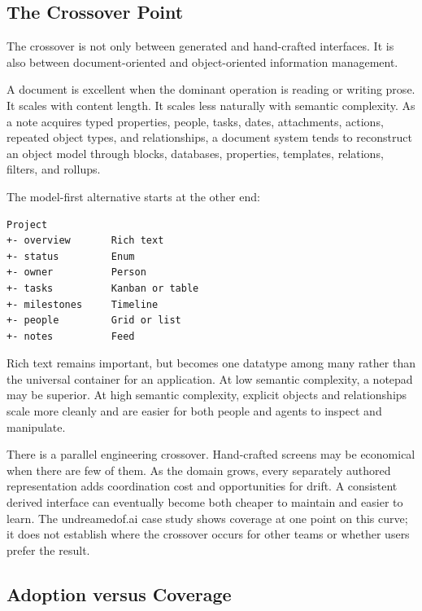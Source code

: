 \documentclass[sigplan,review,anonymous,10pt]{acmart}
\begin{document}
\subsection{The Crossover Point}

The crossover is not only between generated and hand-crafted interfaces. It is also between document-oriented and object-oriented information management.

A document is excellent when the dominant operation is reading or writing prose. It scales with content length. It scales less naturally with semantic complexity. As a note acquires typed properties, people, tasks, dates, attachments, actions, repeated object types, and relationships, a document system tends to reconstruct an object model through blocks, databases, properties, templates, relations, filters, and rollups.

The model-first alternative starts at the other end:

\begin{verbatim}
Project
+- overview       Rich text
+- status         Enum
+- owner          Person
+- tasks          Kanban or table
+- milestones     Timeline
+- people         Grid or list
+- notes          Feed
\end{verbatim}

Rich text remains important, but becomes one datatype among many rather than the universal container for an application. At low semantic complexity, a notepad may be superior. At high semantic complexity, explicit objects and relationships scale more cleanly and are easier for both people and agents to inspect and manipulate.

There is a parallel engineering crossover. Hand-crafted screens may be economical when there are few of them. As the domain grows, every separately authored representation adds coordination cost and opportunities for drift. A consistent derived interface can eventually become both cheaper to maintain and easier to learn. The undreamedof.ai case study shows coverage at one point on this curve; it does not establish where the crossover occurs for other teams or whether users prefer the result.

\subsection{Adoption versus Coverage}
\end{document}
